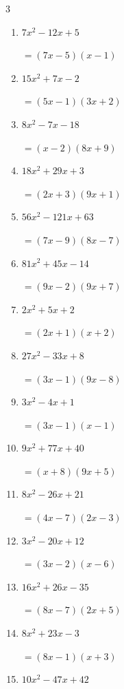 \begin{multicols}{3}
\begin{enumerate}
\columnbreak %

\resetques

  \item $7x^{2}-12x+5$

        $=(7x-5)(x-1)$

  \item $15x^{2}+7x-2$

        $=(5x-1)(3x+2)$

  \item $8x^{2}-7x-18$

        $=(x-2)(8x+9)$

  \item $18x^{2}+29x+3$

        $=(2x+3)(9x+1)$

  \item $56x^{2}-121x+63$

        $=(7x-9)(8x-7)$

  \item $81x^{2}+45x-14$

        $=(9x-2)(9x+7)$

  \item $2x^{2}+5x+2$

        $=(2x+1)(x+2)$

  \item $27x^{2}-33x+8$

        $=(3x-1)(9x-8)$

  \item $3x^{2}-4x+1$

        $=(3x-1)(x-1)$

  \item $9x^{2}+77x+40$

        $=(x+8)(9x+5)$

\columnbreak %

  \item $8x^{2}-26x+21$

        $=(4x-7)(2x-3)$

  \item $3x^{2}-20x+12$

        $=(3x-2)(x-6)$

  \item $16x^{2}+26x-35$

        $=(8x-7)(2x+5)$

  \item $8x^{2}+23x-3$

        $=(8x-1)(x+3)$

  \item $10x^{2}-47x+42$


\end{enumerate}
\end{multicols}
